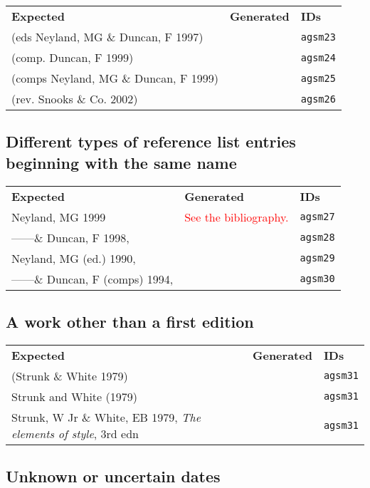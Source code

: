 \documentclass[a4paper,landscape,12pt]{article}
\newlength\q
\newlength\qr
\newenvironment{citetable}
  {\noindent\begin{longtable}{p{\q} p{\q} p{\qr}}\textbf{Expected} & \textbf{Generated} & \textbf{IDs}\\}
  {\end{longtable}}
\newcommand{\majorissue}[1]{\textcolor{red}{#1}}
\newcommand{\minorissue}[1]{\textcolor{blue}{#1}}
\begin{document}
\begin{citetable}
	(eds Neyland, MG \& Duncan, F 1997) & \majorissue{\parencite{agsm23}} & \texttt{agsm23} \\
	(comp. Duncan, F 1999) & \majorissue{\parencite{agsm24}} & \texttt{agsm24} \\
	(comps Neyland, MG \& Duncan, F 1999) & \majorissue{\parencite{agsm25}} & \texttt{agsm25} \\
	(rev. Snooks \& Co. 2002) & \majorissue{\parencite{agsm26}} & \texttt{agsm26} \\
\end{citetable}

\subsection{Different types of reference list entries beginning with the same name}

\begin{citetable}
	Neyland, MG 1999 & \majorissue{See the bibliography.}\nocite{agsm27,agsm28,agsm29,agsm30} & \texttt{agsm27} \\
	------\& Duncan, F 1998, & & \texttt{agsm28} \\
	Neyland, MG (ed.) 1990, & & \texttt{agsm29} \\
	------\& Duncan, F (comps) 1994, & & \texttt{agsm30} \\
\end{citetable}

\subsection{A work other than a first edition}

\begin{citetable}
	(Strunk \& White 1979) & \parencite{agsm31} & \texttt{agsm31} \\
	Strunk and White (1979) & \textcite{agsm31} & \texttt{agsm31} \\
	Strunk, W Jr \& White, EB 1979, \textit{The elements of style}, 3rd edn & \minorissue{\fullcite{agsm31}} & \texttt{agsm31} \\
\end{citetable}

\subsection{Unknown or uncertain dates}
\end{document}

